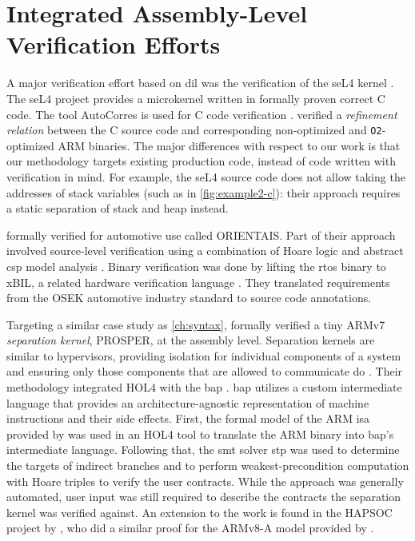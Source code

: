 \section{Integrated Assembly-Level Verification Efforts}\label{se:integrated_assembly}
A major verification effort based on \acl{dil}
was the verification of the seL4 kernel \autocite{klein2009sel4,Klein_AEMSKH_14}.
The seL4 project provides a microkernel written in formally proven correct C code.
The tool AutoCorres is used for C code verification \autocite{greenaway2012bridging}.
\textcite{sewell2013tvv} verified a \emph{refinement relation} between the C source code
and corresponding non-optimized and \lstinline|O2|-optimized ARM binaries.
The major differences with respect to our work
is that our methodology targets existing production code,
instead of code written with verification in mind.
For example, the seL4 source code does not allow taking the addresses of stack variables
(such as in \cref{fig:example2-c}):
their approach requires a static separation of stack and heap instead.

\textcite{shi2012orientais} formally verified  for automotive use
called ORIENTAIS.
Part of their approach involved source-level verification
using a combination of Hoare logic
and abstract \ac{csp} model analysis \autocite{hoare1978csp}.
Binary verification was done by lifting the \ac{rtos} binary to xBIL,
a related hardware verification language \autocite{shi2012xbil}.
They translated requirements from the OSEK automotive industry standard
to source code annotations.

Targeting a similar case study as \cref{ch:syntax},
\textcite{dam2013hypervisor,dam2013formal}
formally verified a tiny ARMv7 \emph{separation kernel},%
PROSPER, at the assembly level.
Separation kernels are similar to hypervisors,
providing isolation for individual components of a system and ensuring
only those components that are allowed to communicate do \autocite{rushby1981dvss}.
Their methodology integrated HOL4 with the \ac{bap} \autocite{brumley2011bap}.
\Ac{bap} utilizes a custom intermediate language
that provides an architecture-agnostic representation of machine instructions
and their side effects.
First, the formal model of the ARM \ac{isa} provided by \textcite{fox2010arm} was used
in an HOL4 tool to translate the ARM binary into \ac{bap}'s intermediate language.
Following that, the \ac{smt} solver \ac{stp}  \autocite{ganesh2007stp}
was used to determine the targets of indirect branches
and to perform weakest-precondition computation with Hoare triples
to verify the user contracts.
While the approach was generally automated,
user input was still required to describe the contracts
the separation kernel was verified against.
An extension to the work is found in the HAPSOC project by \textcite{baumann2016high},
who did a similar proof for the ARMv8-A model provided by \textcite{fox2015improved}.

